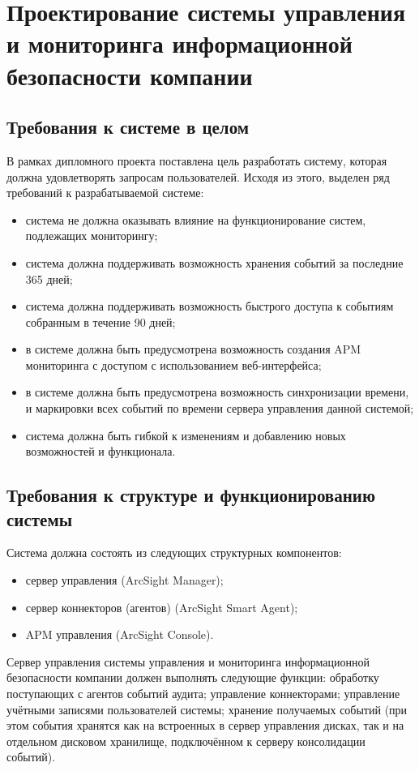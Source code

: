 \section{Проектирование системы управления и мониторинга информационной безопасности компании}
\label{sec:designing}

\subsection{Требования к системе в целом}
В рамках дипломного проекта поставлена цель разработать систему, которая должна удовлетворять запросам пользователей. Исходя из этого, выделен ряд требований к разрабатываемой системе:
\begin{itemize}
    \item система не должна оказывать влияние на функционирование систем, подлежащих мониторингу;
    \item система должна поддерживать возможность хранения событий за последние 365 дней;
    \item система должна поддерживать возможность быстрого доступа к событиям собранным в течение 90 дней;
    \item в системе должна быть предусмотрена возможность создания APM мониторинга с доступом с использованием веб-интерфейса;
    \item в системе должна быть предусмотрена возможность синхронизации времени, и маркировки всех событий по времени сервера управления данной системой;
    \item система должна быть гибкой к изменениям и добавлению новых возможностей и функционала.
\end{itemize}

\subsection{Требования к структуре и функционированию системы}
Система должна состоять из следующих структурных компонентов:
\begin{itemize}
    \item сервер управления (ArcSight Manager);
    \item сервер коннекторов (агентов) (ArcSight Smart Agent);
    \item APM управления (ArcSight Console).
\end{itemize}

Сервер управления системы управления и мониторинга информационной безопасности компании должен выполнять следующие функции: обработку поступающих с агентов событий аудита; управление коннекторами; управление учётными записями пользователей системы; хранение получаемых событий (при этом события хранятся как на встроенных в сервер управления дисках, так и на отдельном дисковом хранилище, подключённом к серверу консолидации событий).

